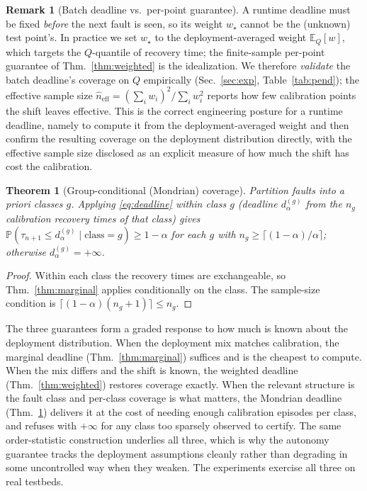 \documentclass[11pt]{article}
\theoremstyle{plain}
\newtheorem{theorem}{Theorem}
\theoremstyle{definition}
\newtheorem{remark}{Remark}
\newcommand{\E}{\mathbb{E}}
\newcommand{\Prob}{\mathbb{P}}
\newcommand{\dalpha}{d_{\alpha}}
\begin{document}
\begin{remark}[Batch deadline vs.\ per-point guarantee]
\label{rem:batch}
A runtime deadline must be fixed \emph{before} the next fault is seen, so its weight
$w_\star$ cannot be the (unknown) test point's. In practice we set $w_\star$ to the
deployment-averaged weight $\E_Q[w]$, which targets the $Q$-quantile of recovery time; the
finite-sample per-point guarantee of Thm.~\ref{thm:weighted} is the idealization. We
therefore \emph{validate} the batch deadline's coverage on $Q$ empirically
(Sec.~\ref{sec:exp}, Table~\ref{tab:pend}); the effective sample size
$\widehat{n}_{\mathrm{eff}}=(\sum_i w_i)^2/\sum_i w_i^2$ reports how few calibration points
the shift leaves effective. This is the correct engineering posture for a runtime deadline,
namely to compute it from the deployment-averaged weight and then confirm the resulting
coverage on the deployment distribution directly, with the effective sample size disclosed as
an explicit measure of how much the shift has cost the calibration.
\end{remark}

\begin{theorem}[Group-conditional (Mondrian) coverage]
\label{thm:mondrian}
Partition faults into a priori classes $g$. Applying \eqref{eq:deadline} within class $g$
(deadline $\dalpha^{(g)}$ from the $n_g$ calibration recovery times of that class) gives
$\Prob(\tau_{n+1}\le \dalpha^{(g)}\mid \text{class}=g)\ge 1-\alpha$ for each $g$ with
$n_g\ge \lceil(1-\alpha)/\alpha\rceil$; otherwise $\dalpha^{(g)}=+\infty$.
\end{theorem}
\begin{proof}
Within each class the recovery times are exchangeable, so Thm.~\ref{thm:marginal} applies
conditionally on the class. The sample-size condition is $\lceil(1-\alpha)(n_g+1)\rceil\le
n_g$.
\end{proof}

The three guarantees form a graded response to how much is known about the deployment
distribution. When the deployment mix matches calibration, the marginal deadline
(Thm.~\ref{thm:marginal}) suffices and is the cheapest to compute. When the mix differs and
the shift is known, the weighted deadline (Thm.~\ref{thm:weighted}) restores coverage exactly.
When the relevant structure is the fault class and per-class coverage is what matters, the
Mondrian deadline (Thm.~\ref{thm:mondrian}) delivers it at the cost of needing enough
calibration episodes per class, and refuses with $+\infty$ for any class too sparsely
observed to certify. The same order-statistic construction underlies all three, which is why
the autonomy guarantee tracks the deployment assumptions cleanly rather than degrading in
some uncontrolled way when they weaken. The experiments exercise all three on real testbeds.
\end{document}

